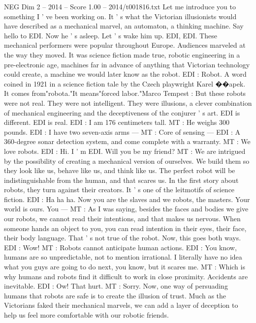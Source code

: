 \begin{textsample}{NEG Dim 2 – 2014 – Score 1.00 – 2014/t001816.txt}  \label{ex:f2_neg_036}
Let me introduce you to something I ' ve been working on.
It ' s what the Victorian illusionists would have described as a mechanical marvel, an automaton, a thinking machine.
Say hello to EDI.
Now he ' s asleep.
Let ' s wake him up.
EDI, EDI.
These mechanical performers were popular throughout Europe.
Audiences marveled at the way they moved.
It was science fiction made true, robotic engineering in a pre-electronic age, machines far in advance of anything that Victorian technology could create, a machine we would later know as the robot.
EDI : Robot.
A word coined in 1921 in a science fiction tale by the Czech playwright Karel {\EmojiFont �}{\EmojiFont �}apek.
It comes from"robota."It means"forced labor."Marco Tempest : But these robots were not real.
They were not intelligent.
They were illusions, a clever combination of mechanical engineering and the deceptiveness of the conjurer ' s art.
EDI is different.
EDI is real.
EDI : I am 176 centimeters tall.
MT : He weighs 300 pounds.
EDI : I have two seven-axis arms — MT : Core of sensing — EDI : A 360-degree sonar detection system, and come complete with a warranty.
MT : We love robots.
EDI : Hi.
I ' m EDI.
Will you be my friend?
MT : We are intrigued by the possibility of creating a mechanical version of ourselves.
We build them so they look like us, behave like us, and think like us.
The perfect robot will be indistinguishable from the human, and that scares us.
In the first story about robots, they turn against their creators.
It ' s one of the leitmotifs of science fiction.
EDI : Ha ha ha.
Now you are the slaves and we robots, the masters.
Your world is ours.
You — MT : As I was saying, besides the faces and bodies we give our robots, we cannot read their intentions, and that makes us nervous.
When someone hands an object to you, you can read intention in their eyes, their face, their body language.
That ' s not true of the robot.
Now, this goes both ways.
EDI : Wow!
MT : Robots cannot anticipate human actions.
EDI : You know, humans are so unpredictable, not to mention irrational.
I literally have no idea what you guys are going to do next, you know, but it scares me.
MT : Which is why humans and robots find it difficult to work in close proximity.
Accidents are inevitable.
EDI : Ow!
That hurt.
MT : Sorry.
Now, one way of persuading humans that robots are safe is to create the illusion of trust.
Much as the Victorians faked their mechanical marvels, we can add a layer of deception to help us feel more comfortable with our robotic friends.

\end{textsample}
